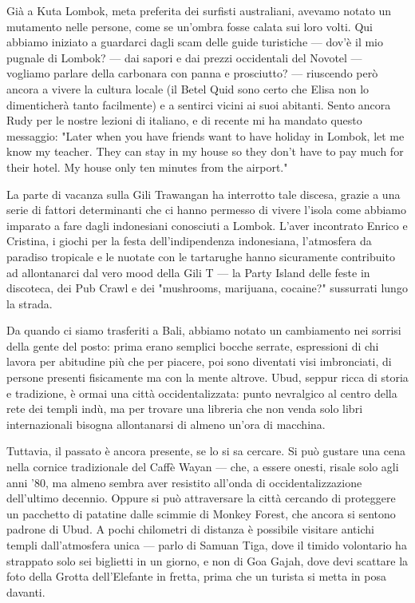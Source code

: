 Già a Kuta Lombok, meta preferita dei surfisti australiani, avevamo notato un mutamento nelle persone, come se un'ombra fosse calata sui loro volti. Qui abbiamo iniziato a guardarci dagli scam delle guide turistiche — dov'è il mio pugnale di Lombok? — dai sapori e dai prezzi occidentali del Novotel — vogliamo parlare della carbonara con panna e prosciutto? — riuscendo però ancora a vivere la cultura locale (il Betel Quid sono certo che Elisa non lo dimenticherà tanto facilmente) e a sentirci vicini ai suoi abitanti. Sento ancora Rudy per le nostre lezioni di italiano, e di recente mi ha mandato questo messaggio: "Later when you have friends want to have holiday in Lombok, let me know my teacher. They can stay in my house so they don't have to pay much for their hotel. My house only ten minutes from the airport."

La parte di vacanza sulla Gili Trawangan ha interrotto tale discesa, grazie a una serie di fattori determinanti che ci hanno permesso di vivere l'isola come abbiamo imparato a fare dagli indonesiani conosciuti a Lombok. L'aver incontrato Enrico e Cristina, i giochi per la festa dell'indipendenza indonesiana, l'atmosfera da paradiso tropicale e le nuotate con le tartarughe hanno sicuramente contribuito ad allontanarci dal vero mood della Gili T — la Party Island delle feste in discoteca, dei Pub Crawl e dei "mushrooms, marijuana, cocaine?" sussurrati lungo la strada.

Da quando ci siamo trasferiti a Bali, abbiamo notato un cambiamento nei sorrisi della gente del posto: prima erano semplici bocche serrate, espressioni di chi lavora per abitudine più che per piacere, poi sono diventati visi imbronciati, di persone presenti fisicamente ma con la mente altrove. Ubud, seppur ricca di storia e tradizione, è ormai una città occidentalizzata: punto nevralgico al centro della rete dei templi indù, ma per trovare una libreria che non venda solo libri internazionali bisogna allontanarsi di almeno un'ora di macchina.

Tuttavia, il passato è ancora presente, se lo si sa cercare. Si può gustare una cena nella cornice tradizionale del Caffè Wayan — che, a essere onesti, risale solo agli anni '80, ma almeno sembra aver resistito all'onda di occidentalizzazione dell'ultimo decennio. Oppure si può attraversare la città cercando di proteggere un pacchetto di patatine dalle scimmie di Monkey Forest, che ancora si sentono padrone di Ubud. A pochi chilometri di distanza è possibile visitare antichi templi dall'atmosfera unica — parlo di Samuan Tiga, dove il timido volontario ha strappato solo sei biglietti in un giorno, e non di Goa Gajah, dove devi scattare la foto della Grotta dell'Elefante in fretta, prima che un turista si metta in posa davanti.

